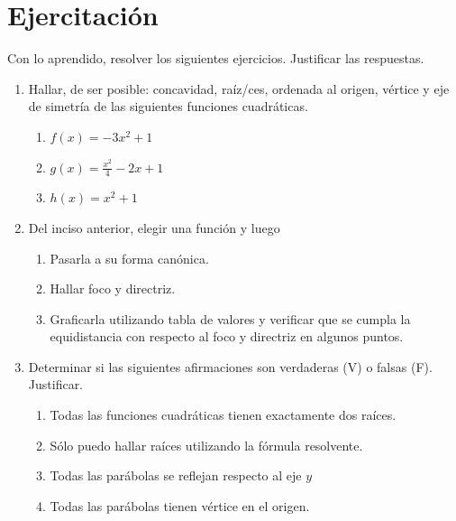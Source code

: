 \documentclass{article}
\begin{document}
\section{Ejercitación}
Con lo aprendido, resolver los siguientes ejercicios. Justificar las respuestas.

\begin{enumerate}
    \item Hallar, de ser posible: concavidad, raíz/ces, ordenada al origen, vértice y eje de simetría de las siguientes funciones cuadráticas.
    \begin{enumerate}
        \item $f(x)=-3x^2+1$
        \item $g(x)=\frac{x^2}{4}-2x+1$
        \item $h(x)=x^2+1$
    \end{enumerate}

    \item Del inciso anterior, elegir una función y luego
    \begin{enumerate}
        \item Pasarla a su forma canónica.
        \item Hallar foco y directriz.
        \item Graficarla utilizando tabla de valores y verificar que se cumpla la equidistancia con respecto al foco y directriz en algunos puntos.
    \end{enumerate}
    
    \item Determinar si las siguientes afirmaciones son verdaderas (V) o falsas (F). Justificar.
    \begin{enumerate}
        \item Todas las funciones cuadráticas tienen exactamente dos raíces.
        \item Sólo puedo hallar raíces utilizando la fórmula resolvente.
        \item Todas las parábolas se reflejan respecto al eje $y$
        \item Todas las parábolas tienen vértice en el origen.
    \end{enumerate}
\end{enumerate}
\end{document}
